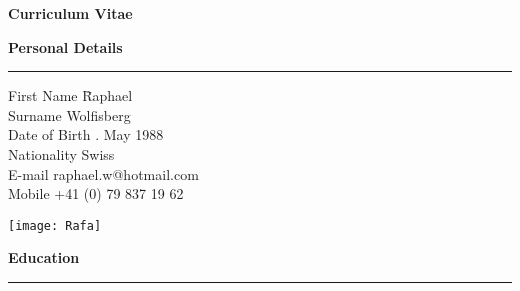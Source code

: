 


\graphicspath{{./Pictures/}}





\newpage
\pagestyle{plain}
\vspace{-9cm}

\huge
\textbf{Curriculum Vitae}

\bigskip
\bigskip
\large
\textbf{Personal Details}
\noindent\rule[3mm]{\linewidth}{1pt}

\normalsize
\vspace{0.2cm}
\begin{tabbing}
First Name \hspace*{2.4cm} \= Raphael \\
Surname \> Wolfisberg \\
Date of Birth . May 1988 \\
Nationality \> Swiss \\ [0.2 cm]
E-mail \> raphael.w@hotmail.com \\
Mobile \> +41 (0) 79 837 19 62 
\end{tabbing}

\begin{addmargin}{0.03\textwidth}
\vspace{-4.55 cm}
\begin{flushright}
\texttt{[image: Rafa]} \\[1cm]
\end{flushright}
\end{addmargin}


\vspace{-1.2cm}
\large
\textbf{Education}
\noindent\rule[3mm]{\linewidth}{1pt}

